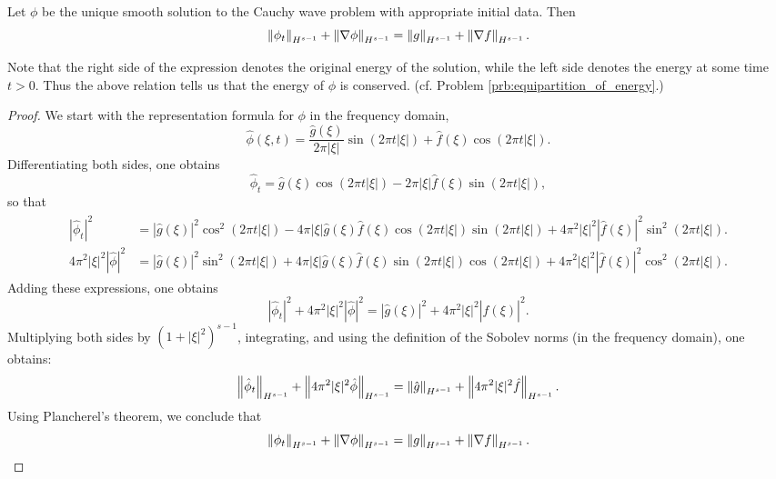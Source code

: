 \documentclass{article}
\numberwithin{equation}{section}
\begin{document}
	\begin{prop}
		Let $\phi$ be the unique smooth solution to the Cauchy wave problem with appropriate initial data. Then 
		\begin{equation*}
			\left\Vert \phi_{t} \right\Vert_{H^{s - 1}} + \left\Vert \nabla \phi \right\Vert_{H^{s - 1}} = \left\Vert g \right\Vert_{H^{s - 1}} + \left\Vert \nabla f \right\Vert_{H^{s- 1}}. 
		\end{equation*}
	\end{prop}
	\begin{remark}
		Note that the right side of the expression denotes the original energy of the solution, while the left side denotes the energy at some time $t > 0$. Thus the above relation tells us that the energy of $\phi$ is conserved. (cf. Problem \ref{prb:equipartition_of_energy}.)
	\end{remark}
	\begin{proof}
		We start with the representation formula for $\phi$ in the frequency domain, 
		\begin{equation*}
			\hat{\phi}(\xi, t) = \frac{\hat{g}(\xi)}{2\pi |\xi|}\sin(2\pi t |\xi|) + \hat{f}(\xi)\cos(2\pi t |\xi|). 
		\end{equation*}
		Differentiating both sides, one obtains 
		\begin{equation*}
			\hat{\phi}_{t} = \hat{g}(\xi)\cos(2\pi t |\xi|) - 2\pi |\xi|\hat{f}(\xi)\sin(2\pi t |\xi|), 
		\end{equation*}
		so that 
		\begin{align*}
			\begin{split}
				|\hat{\phi}_{t}|^{2} &= |\hat{g}(\xi)|^{2}\cos^{2}(2\pi t|\xi|) -4\pi |\xi|\hat{g}(\xi)\hat{f}(\xi)\cos(2\pi t|\xi|)\sin(2\pi t|\xi|) + 4\pi^{2}|\xi|^{2}|\hat{f}(\xi)|^{2}\sin^{2}(2\pi t |\xi|). \\
				4\pi^{2}|\xi|^{2}|\hat{\phi}|^{2} &= |\hat{g}(\xi)|^{2}\sin^{2}(2\pi t|\xi|) + 4\pi|\xi|\hat{g}(\xi)\hat{f}(\xi)\sin(2\pi t|\xi|) \cos(2\pi t|\xi|) + 4\pi^{2}|\xi|^{2}|\hat{f}(\xi)|^{2}\cos^{2}(2\pi t |\xi|). 
			\end{split}
		\end{align*}
		Adding these expressions, one obtains 
		\begin{equation*}
			|\hat{\phi}_{t}|^{2} + 4\pi^{2}|\xi|^{2}|\hat{\phi}|^{2} = |\hat{g}(\xi)|^{2} + 4\pi^{2}|\xi|^{2}|\hat{f}(\xi)|^{2}. 
		\end{equation*}
		Multiplying both sides by $(1 + |\xi|^{2})^{s - 1}$, integrating, and using the definition of the Sobolev norms (in the frequency domain), one obtains: 
		\begin{equation*}
			\left\Vert \hat{\phi}_{t} \right\Vert_{H^{s - 1}} + \left\Vert 4\pi^{2}|\xi|^{2}\hat{\phi} \right\Vert_{H^{s - 1}} = \left\Vert \hat{g} \right\Vert_{H^{s - 1}} + \left\Vert 4\pi^{2}|\xi|^{2}\hat{f} \right\Vert_{H^{s - 1}}. 
		\end{equation*}
		Using Plancherel's theorem, we conclude that
		\begin{equation*}
			\left\Vert \phi_{t} \right\Vert_{H^{s- 1}} + \left\Vert \nabla \phi \right\Vert_{H^{s - 1}} = \left\Vert g \right\Vert_{H^{s - 1}} + \left\Vert \nabla f \right\Vert_{H^{s - 1}}. 
		\end{equation*}
	\end{proof}
	
\end{document}

